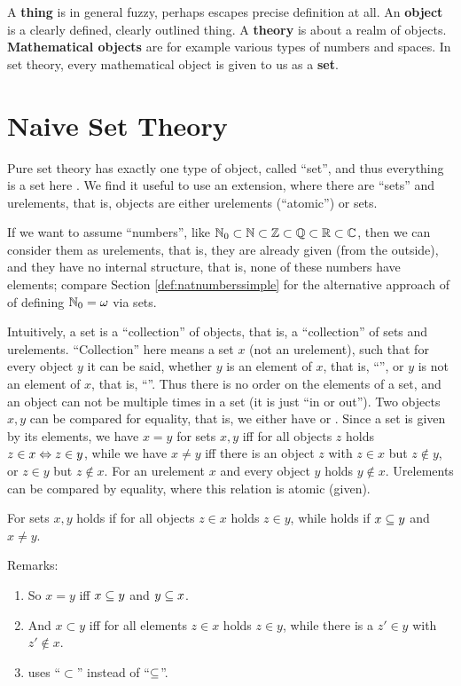 \documentclass[12pt]{book}
\begin{document}
A \textbf{thing} is in general fuzzy, perhaps escapes precise definition at all. An \textbf{object} is a clearly defined, clearly outlined thing. A \textbf{theory} is about a realm of objects.
\textbf{Mathematical objects} are for example various types of numbers and spaces. In set theory, every mathematical object is given to us as a \textbf{set}.

\section{Naive Set Theory}
\label{sec:Naivesettheory}

Pure set theory has exactly one type of object, called ``set'', and thus everything is a set here  \cite{h1}. We find it useful to use an extension, where there are ``sets'' and urelements, that is, objects are either urelements (``atomic'') or sets.
\begin{examp}\label{exp:urelemente}
If we want to assume ``numbers'', like $\mathbb{N}_0 \subset \mathbb{N} \subset \mathbb{Z} \subset \mathbb{Q} \subset \mathbb{R} \subset \mathbb{C}$, then we can consider them as urelements, that is, they are already given (from the outside), and they have no internal structure, that is, none of these numbers have elements; compare Section \ref{def:natnumberssimple} for the alternative approach of of defining $\mathbb{N}_0 = \omega$ via sets.
\end{examp}
Intuitively, a set is a ``collection'' of objects, that is, a ``collection'' of sets and urelements. ``Collection'' here means a set $x$ (not an urelement), such that for every object $y$ it can be said, whether $y$ is an element of $x$, that is, ``'', or $y$ is not an element of $x$, that is, ``''. Thus there is no order on the elements of a set, and an object can not be multiple times in a set (it is just ``in or out''). 
Two objects $x, y$ can be compared for equality, that is, we either have  or . Since a set is given by its elements, we have $x = y$ for sets $x, y$ iff for all objects $z$ holds $z \in x \Leftrightarrow z \in y$, while we have $x \ne y$ iff there is an object $z$ with $z \in x$ but $z \notin y$, or $z \in y$ but $z \notin x$.
For an urelement $x$ and every object $y$ holds $y \notin x$. Urelements can be compared by equality, where this relation is atomic (given).

\begin{defi}\label{def:sse}
  For sets $x, y$ holds  if for all objects $z \in x$ holds $z \in y$, while  holds if $x \subseteq y$ and $x \ne y$.
\end{defi}
Remarks:
\begin{enumerate}
\item So $x = y$ iff $x \subseteq y$ and $y \subseteq x$.
\item And $x \subset y$ iff for all elements $z \in x$ holds $z \in y$, while there is a $z' \in y$ with $z' \notin x$.
\item \cite{h2} uses ``$\subset$'' instead of ``$\subseteq$''.
\end{enumerate}
\end{document}
